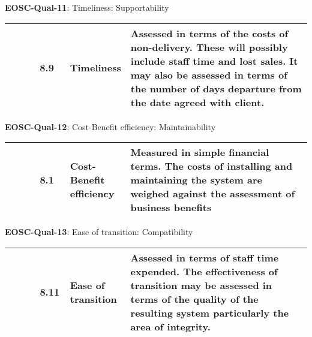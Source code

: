 \textbf{EOSC-Qual-11}: Timeliness: Supportability
\nopagebreak[4]
\begin{center}
    \tabletail{\hline}
    \tiny
    \begin{supertabular}{|p{0.10\linewidth}|p{0.10\linewidth}|p{0.20\linewidth}|p{0.60\linewidth}|} \hline
        \cite{gillies_modelling_1992} & 8.9 & Timeliness & Assessed in terms of the costs of non-delivery. These will possibly include staff time and lost sales. It may also be assessed in terms of the number of days departure from the date agreed with client.\\ \hline
    \end{supertabular}
\end{center}

\textbf{EOSC-Qual-12}: Cost-Benefit efficiency: Maintainability
\nopagebreak[4]
\begin{center}
    \tabletail{\hline}
    \tiny
    \begin{supertabular}{|p{0.10\linewidth}|p{0.10\linewidth}|p{0.20\linewidth}|p{0.60\linewidth}|} \hline
        \cite{gillies_modelling_1992} & 8.1 & Cost-Benefit efficiency & Measured in simple financial terms. The costs of installing and maintaining the system are weighed against the assessment of business benefits\\ \hline
    \end{supertabular}
\end{center}

\textbf{EOSC-Qual-13}: Ease of transition: Compatibility
\nopagebreak[4]
\begin{center}
    \tabletail{\hline}
    \tiny
    \begin{supertabular}{|p{0.10\linewidth}|p{0.10\linewidth}|p{0.20\linewidth}|p{0.60\linewidth}|} \hline
        \cite{gillies_modelling_1992} & 8.11 & Ease of transition & Assessed in terms of staff time expended. The effectiveness of transition may be assessed in terms of the quality of the resulting system particularly the area of integrity.\\ \hline
    \end{supertabular}
\end{center}

